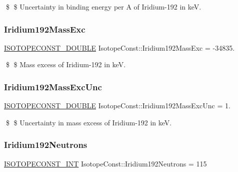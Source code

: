 \$ \$ Uncertainty in binding energy per A of Iridium-\/192 in keV. \mbox{\label{group___isotope_const-_iridium-_ir192_ga377fb679331a390164107a97a64a8d04}} 
\subsubsection{\texorpdfstring{Iridium192\+Mass\+Exc}{Iridium192MassExc}}
{\footnotesize\ttfamily \mbox{\hyperlink{group___isotope_const-_macros_ga8f45a7272ce02c0b4c65c44636ed719a}{I\+S\+O\+T\+O\+P\+E\+C\+O\+N\+S\+T\+\_\+\+D\+O\+U\+B\+LE}} Isotope\+Const\+::\+Iridium192\+Mass\+Exc = -\/34835.}

\$ \$ Mass excess of Iridium-\/192 in keV. \mbox{\label{group___isotope_const-_iridium-_ir192_ga4721323beabf88be58fc197cf09fa3db}} 
\subsubsection{\texorpdfstring{Iridium192\+Mass\+Exc\+Unc}{Iridium192MassExcUnc}}
{\footnotesize\ttfamily \mbox{\hyperlink{group___isotope_const-_macros_ga8f45a7272ce02c0b4c65c44636ed719a}{I\+S\+O\+T\+O\+P\+E\+C\+O\+N\+S\+T\+\_\+\+D\+O\+U\+B\+LE}} Isotope\+Const\+::\+Iridium192\+Mass\+Exc\+Unc = 1.}

\$ \$ Uncertainty in mass excess of Iridium-\/192 in keV. \mbox{\label{group___isotope_const-_iridium-_ir192_ga09a0301a0d85bca0936b4c30c6112030}} 
\subsubsection{\texorpdfstring{Iridium192\+Neutrons}{Iridium192Neutrons}}
{\footnotesize\ttfamily \mbox{\hyperlink{group___isotope_const-_macros_ga5f18360b3e99483a35c32d789e62621c}{I\+S\+O\+T\+O\+P\+E\+C\+O\+N\+S\+T\+\_\+\+I\+NT}} Isotope\+Const\+::\+Iridium192\+Neutrons = 115}

